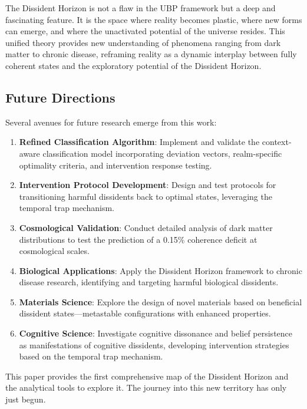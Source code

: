 \documentclass[12pt, a4paper]{article}
\begin{document}
The Dissident Horizon is not a flaw in the UBP framework but a deep and fascinating feature. It is the space where reality becomes plastic, where new forms can emerge, and where the unactivated potential of the universe resides. This unified theory provides new understanding of phenomena ranging from dark matter to chronic disease, reframing reality as a dynamic interplay between fully coherent states and the exploratory potential of the Dissident Horizon.

\subsection{Future Directions}

Several avenues for future research emerge from this work:

\begin{enumerate}
    \item \textbf{Refined Classification Algorithm}: Implement and validate the context-aware classification model incorporating deviation vectors, realm-specific optimality criteria, and intervention response testing.
    
    \item \textbf{Intervention Protocol Development}: Design and test protocols for transitioning harmful dissidents back to optimal states, leveraging the temporal trap mechanism.
    
    \item \textbf{Cosmological Validation}: Conduct detailed analysis of dark matter distributions to test the prediction of a 0.15\% coherence deficit at cosmological scales.
    
    \item \textbf{Biological Applications}: Apply the Dissident Horizon framework to chronic disease research, identifying and targeting harmful biological dissidents.
    
    \item \textbf{Materials Science}: Explore the design of novel materials based on beneficial dissident states—metastable configurations with enhanced properties.
    
    \item \textbf{Cognitive Science}: Investigate cognitive dissonance and belief persistence as manifestations of cognitive dissidents, developing intervention strategies based on the temporal trap mechanism.
\end{enumerate}

This paper provides the first comprehensive map of the Dissident Horizon and the analytical tools to explore it. The journey into this new territory has only just begun.
\end{document}

